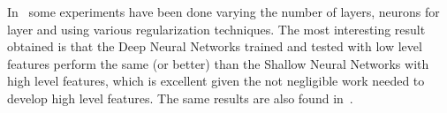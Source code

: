 In~\cite{gaia} some experiments have been done varying the number of layers,
neurons for layer and using various regularization techniques. The most
interesting result obtained is that the Deep Neural Networks trained and
tested with low level features perform the same (or better) than the Shallow
Neural Networks with high level features, which is excellent given the not
negligible work needed to develop high level features. The same results are
also found in~\cite{paper}.
\begin{figure}
 \centering
  \quad
  \\
  \quad
  \\
 \caption{}
 \label{graphs}
\end{figure}
